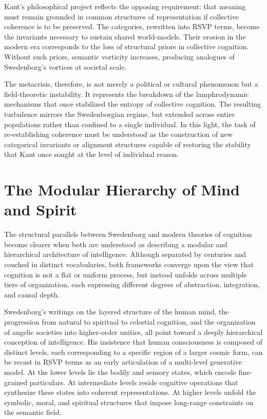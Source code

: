 \documentclass[12pt]{article}
\begin{document}
Kant’s philosophical project reflects the opposing requirement: that meaning 
must remain grounded in common structures of representation if collective 
coherence is to be preserved. The categories, rewritten into RSVP terms, 
become the invariants necessary to sustain shared world-models. Their erosion 
in the modern era corresponds to the loss of structural priors in collective 
cognition. Without such priors, semantic vorticity increases, producing 
analogues of Swedenborg’s vortices at societal scale. 

The metacrisis, therefore, is not merely a political or cultural phenomenon 
but a field-theoretic instability. It represents the breakdown of the 
lamphrodynamic mechanisms that once stabilized the entropy of collective 
cognition. The resulting turbulence mirrors the Swedenborgian regime, but 
extended across entire populations rather than confined to a single 
individual. In this light, the task of re-establishing coherence must be 
understood as the construction of new categorical invariants or alignment 
structures capable of restoring the stability that Kant once sought at the 
level of individual reason.

\newpage
\section{The Modular Hierarchy of Mind and Spirit}

The structural parallels between Swedenborg and modern theories of cognition 
become clearer when both are understood as describing a modular and hierarchical 
architecture of intelligence. Although separated by centuries and couched in 
distinct vocabularies, both frameworks converge upon the view that cognition is 
not a flat or uniform process, but instead unfolds across multiple tiers of 
organization, each expressing different degrees of abstraction, integration, 
and causal depth.

Swedenborg’s writings on the layered structure of the human mind, the 
progression from natural to spiritual to celestial cognition, and the 
organization of angelic societies into higher-order unities, all point toward a 
deeply hierarchical conception of intelligence. His insistence that human 
consciousness is composed of distinct levels, each corresponding to a specific 
region of a larger cosmic form, can be recast in RSVP terms as an early 
articulation of a multi-level generative model. At the lower levels lie the 
bodily and sensory states, which encode fine-grained particulars. At 
intermediate levels reside cognitive operations that synthesize these states 
into coherent representations. At higher levels unfold the symbolic, 
moral, and spiritual structures that impose long-range constraints on the 
semantic field.
\end{document}
